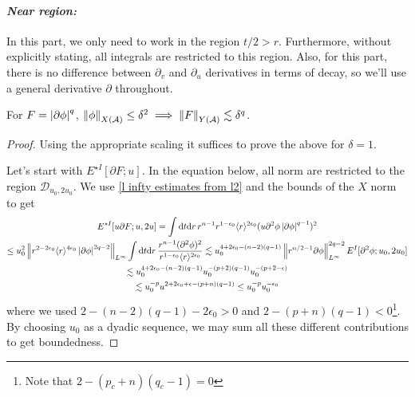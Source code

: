 \documentclass[11pt, oneside]{amsart}
\begin{document}
	\paragraph{\textit{Near region:}}
	In this part, we only need to work in the region $t/2>r$. Furthermore, without explicitly stating, all integrals are restricted to this region. Also, for this part, there is no difference between $\partial_v$ and $\partial_u$ derivatives in terms of decay, so we'll use a general derivative $\partial$ throughout.
	\begin{lemma}
		For $F=\left\lvert \partial\phi\right\rvert^q$,  $\left\lVert \phi\right\rVert_{X(\mathcal{A})}\leq\delta^2\implies\left\lVert F\right\rVert_{Y(\mathcal{A})}\lesssim\delta^q$.
	\end{lemma}
	\begin{proof}
		Using the appropriate scaling it suffices to prove the above for $\delta=1$.
		
		Let's start with $E^{\star I}[\partial F;u]$. In the equation below, all norm are restricted to the region ${\mathcal{D}_{u_0,2u_0}}$. We use \cref{l infty estimates from l2} and the bounds of the $X$ norm to get
		\begin{equation*}
			\begin{gathered}
				E^{\star I}[u\partial F;u,2u]=\int\mathrm{d} t\mathrm{d} r\, r^{n-1} r^{1-\epsilon_0}\langle r \rangle^{2\epsilon_0}(u\partial^2\phi\left\lvert \partial\phi\right\rvert^{q-1})^2\\\leq u_0^2\left\lVert r^{2-2\epsilon_0}\langle r \rangle^{4\epsilon_0}\left\lvert \partial\phi\right\rvert^{2q-2}\right\rVert_{L^\infty}\int\mathrm{d} t \mathrm{d} r\,\frac{r^{n-1}(\partial^2\phi)^2}{r^{1-\epsilon_0}\langle r \rangle^{2\epsilon_0}}
				\lesssim u_0^{4+2\epsilon_0-(n-2)(q-1)}\left\lVert r^{n/2-1}\partial\phi\right\rVert^{2q-2}_{L^\infty}E^{I}[\partial^2\phi;u_0,2u_0]\\\lesssim u_0^{4+2\epsilon_0-(n-2)(q-1)}u_0^{-(p+2)(q-1)}u_0^{-(p+2-\epsilon)}\\\lesssim u_0^{-p}u^{2+2\epsilon_0+\epsilon-(p+n)(q-1)}\leq u_0^{-p}u_0^{-\epsilon_0}
			\end{gathered}
		\end{equation*}
		where we used $2-(n-2)(q-1)-2\epsilon_0>0$ and  $2-(p+n)(q-1)<0$\footnote{Note that $2-(p_c+n)(q_c-1)=0$}.  By choosing $u_0$ as a dyadic sequence, we may sum all these different contributions to get boundedness.
		

\end{proof}
\end{document}
